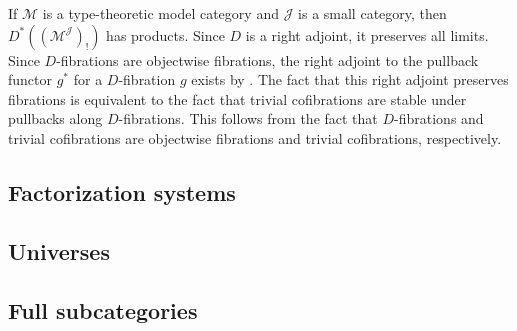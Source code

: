 \documentclass[reqno]{amsart}
\theoremstyle{definition}
\theoremstyle{remark}
\newcommand{\scat}[1]{\mathcal{#1}}
\numberwithin{figure}{section}
\begin{document}
\begin{example}
If $\scat{M}$ is a type-theoretic model category and $\scat{J}$ is a small category, then $D^*((\scat{M}^\scat{J})_!)$ has products.
Since $D$ is a right adjoint, it preserves all limits.
Since $D$-fibrations are objectwise fibrations, the right adjoint to the pullback functor $g^*$ for a $D$-fibration $g$ exists by \cite[Theorem~2.12]{comp-fact-tor}.
The fact that this right adjoint preserves fibrations is equivalent to the fact that trivial cofibrations are stable under pullbacks along $D$-fibrations.
This follows from the fact that $D$-fibrations and trivial cofibrations are objectwise fibrations and trivial cofibrations, respectively.
\end{example}

\subsection{Factorization systems}


\subsection{Universes}


\subsection{Full subcategories}




\end{document}
